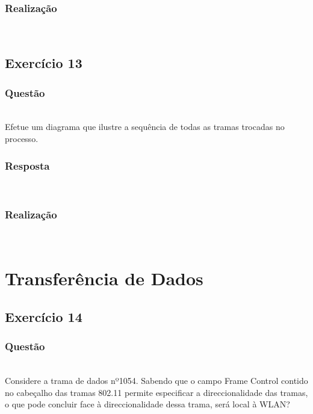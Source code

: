 \documentclass{llncs}
\begin{document}
\subsubsection{Realização}\rule[-10pt]{0pt}{10pt}\\



\clearpage
\subsection{Exercício 13}
\subsubsection{Questão}\rule[-10pt]{0pt}{10pt}\\

Efetue um diagrama que ilustre a sequência de todas as tramas trocadas no processo.

\subsubsection{Resposta}\rule[-10pt]{0pt}{10pt}\\



\subsubsection{Realização}\rule[-10pt]{0pt}{10pt}\\



\clearpage

\section{Transferência de Dados}
\subsection{Exercício 14}
\subsubsection{Questão}\rule[-10pt]{0pt}{10pt}\\

Considere a trama de dados nº1054. Sabendo que o campo Frame Control contido no cabeçalho das tramas 802.11 permite especificar a direccionalidade das tramas, o que pode concluir face à direccionalidade dessa trama, será local à WLAN?
\end{document}
